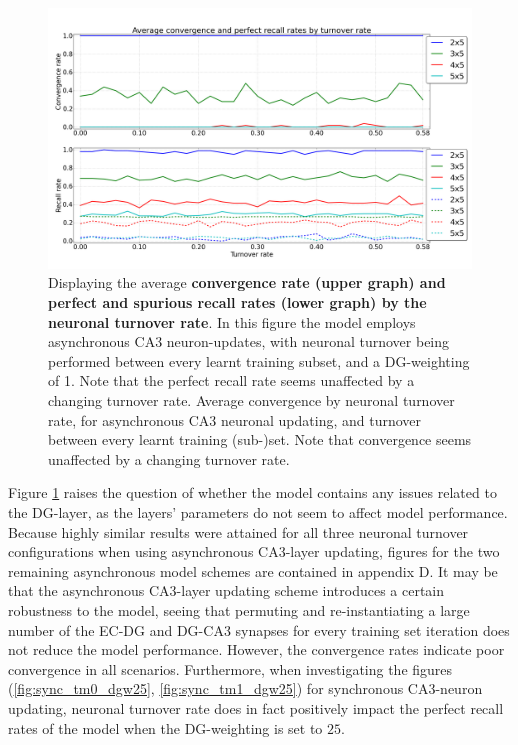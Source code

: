 \begin{figure}
    \centering
    \includegraphics[width=13cm]{fig/turnover_rates/async_tm0_dgw1}
    \caption{Displaying the average \textbf{convergence rate (upper graph) and perfect and spurious recall rates (lower graph) by the neuronal turnover rate}. In this figure the model employs asynchronous CA3 neuron-updates, with neuronal turnover being performed between every learnt training subset, and a DG-weighting of 1. Note that the perfect recall rate seems unaffected by a changing turnover rate.
    Average convergence by neuronal turnover rate, for asynchronous CA3 neuronal updating, and turnover between every learnt training (sub-)set. Note that convergence seems unaffected by a changing turnover rate.}
    \label{fig:async_tm0_dgw1}
\end{figure}

Figure \ref{fig:async_tm0_dgw1} raises the question of whether the model contains any issues related to the DG-layer, as the layers' parameters do not seem to affect model performance. Because highly similar results were attained for all three neuronal turnover configurations when using asynchronous CA3-layer updating, figures for the two remaining asynchronous model schemes are contained in appendix D.
It may be that the asynchronous CA3-layer updating scheme introduces a certain robustness to the model, seeing that permuting and re-instantiating a large number of the EC-DG and DG-CA3 synapses for every training set iteration does not reduce the model performance. 
However, the convergence rates indicate poor convergence in all scenarios. Furthermore, when investigating the figures (\ref{fig:sync_tm0_dgw25}, \ref{fig:sync_tm1_dgw25}) for synchronous CA3-neuron updating, neuronal turnover rate does in fact positively impact the perfect recall rates of the model when the DG-weighting is set to $25$.

